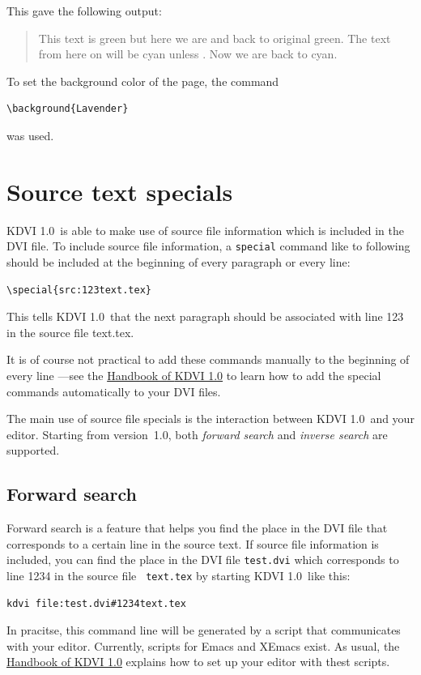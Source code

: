 \documentclass{article}
\newcommand{\KDVI}{{\sf KDVI 1.0}}
\begin{document}
This gave the following output:
\begin{verse}
 \textGreen This text is green but here
we are 
and back to original green.  \textCyan The text from here on will be
cyan unless . Now we are back to
cyan.  \textBlack
\end{verse}

To set the background color of the page, the command
\begin{verbatim}
\background{Lavender}
\end{verbatim}
was used.


\section{Source text specials}

\KDVI\ is able to make use of source file information which is included
in the DVI file. To include source file information, a {\tt special}
command like to following should be included at the beginning of every
paragraph or every line:
\begin{verbatim}
\special{src:123text.tex}
\end{verbatim}
This tells \KDVI\ that the next paragraph should be associated with
line 123 in the source file text.tex.

It is of course not practical to add these commands manually to the
beginning of every line ---see the \href{help:/kdvi}{Handbook of
\KDVI} to learn how to add the special commands automatically to your
DVI files.

The main use of source file specials is the interaction between \KDVI\
and your editor. Starting from version~1.0, both \emph{forward search}
and \emph{inverse search} are supported.

\subsection{Forward search}

Forward search is a feature that helps you find the place in the DVI
file that corresponds to a certain line in the source text. If source
file information is included, you can find the place in the DVI file
{\tt test.dvi} which corresponds to line 1234 in the source file {\tt
text.tex} by starting \KDVI\ like this:
\begin{verbatim}
kdvi file:test.dvi#1234text.tex
\end{verbatim}
In pracitse, this command line will be generated by a script that
communicates with your editor. Currently, scripts for Emacs and XEmacs
exist. As usual, the \href{help:/kdvi/forward-search.html}{Handbook of
\KDVI} explains how to set up your editor with thest scripts.
\end{document}
